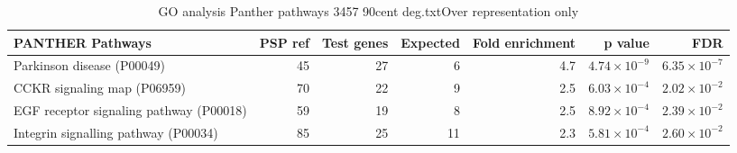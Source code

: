 \begin{table}[ht]
\centering
\begin{adjustbox}{width=\textwidth}
\begin{tabular}{lrrrrrr}
  \hline
PANTHER Pathways & PSP ref & Test genes & Expected & Fold enrichment & p value & FDR \\ 
  \hline
Parkinson disease (P00049) & 45 & 27 & 6 & 4.7 & $4.74 \times 10^{-9}$ & $6.35 \times 10^{-7}$ \\ 
  CCKR signaling map (P06959) & 70 & 22 & 9 & 2.5 & $6.03 \times 10^{-4}$ & $2.02 \times 10^{-2}$ \\ 
  EGF receptor signaling pathway (P00018) & 59 & 19 & 8 & 2.5 & $8.92 \times 10^{-4}$ & $2.39 \times 10^{-2}$ \\ 
  Integrin signalling pathway (P00034) & 85 & 25 & 11 & 2.3 & $5.81 \times 10^{-4}$ & $2.60 \times 10^{-2}$ \\ 
   \hline
\end{tabular}
\end{adjustbox}
\caption{GO analysis Panther pathways 3457 90cent deg.txtOver representation only} 
\label{tab:GO analysis Panther pathways 3457 90cent deg.txtOver representation only}
\end{table}




